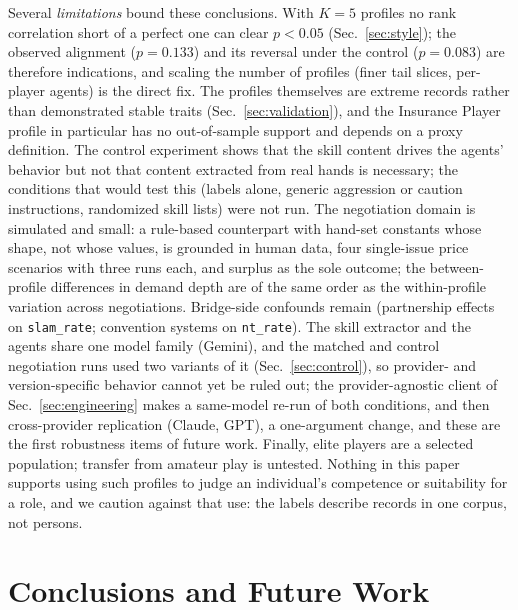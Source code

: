 \documentclass[runningheads]{llncs}
\begin{document}
Several \emph{limitations} bound these conclusions. With $K=5$
profiles no rank correlation short of a perfect one can clear $p<0.05$
(Sec.~\ref{sec:style}); the observed alignment ($p=0.133$) and its
reversal under the control ($p=0.083$) are therefore indications, and
scaling the number of profiles (finer tail slices, per-player agents)
is the direct fix. The profiles themselves are extreme records rather
than demonstrated stable traits (Sec.~\ref{sec:validation}), and the
Insurance Player profile in particular has no out-of-sample support
and depends on a proxy definition. The control experiment shows that
the skill content drives the agents' behavior but not that content
extracted from real hands is necessary; the conditions that would test
this (labels alone, generic aggression or caution instructions,
randomized skill lists) were not run. The negotiation domain is
simulated and small: a rule-based counterpart with hand-set constants
whose shape, not whose values, is grounded in human data, four
single-issue price scenarios with three runs each, and surplus as the
sole outcome; the between-profile differences in demand depth are of
the same order as the within-profile variation across negotiations.
Bridge-side confounds remain (partnership effects on
\texttt{slam\_rate}; convention systems on \texttt{nt\_rate}). The skill
extractor and the agents share one model family (Gemini), and the
matched and control negotiation runs used two variants of it
(Sec.~\ref{sec:control}), so provider- and version-specific behavior
cannot yet be ruled out; the provider-agnostic client of
Sec.~\ref{sec:engineering} makes a same-model re-run of both
conditions, and then cross-provider replication (Claude, GPT), a
one-argument change, and these are the first robustness items of
future work. Finally,
elite players are a selected population; transfer from amateur play is
untested. Nothing in this paper supports using such profiles to judge
an individual's competence or suitability for a role, and we caution
against that use: the labels describe records in one corpus, not
persons.

\section{Conclusions and Future Work}\label{sec:conclusion}
\end{document}
